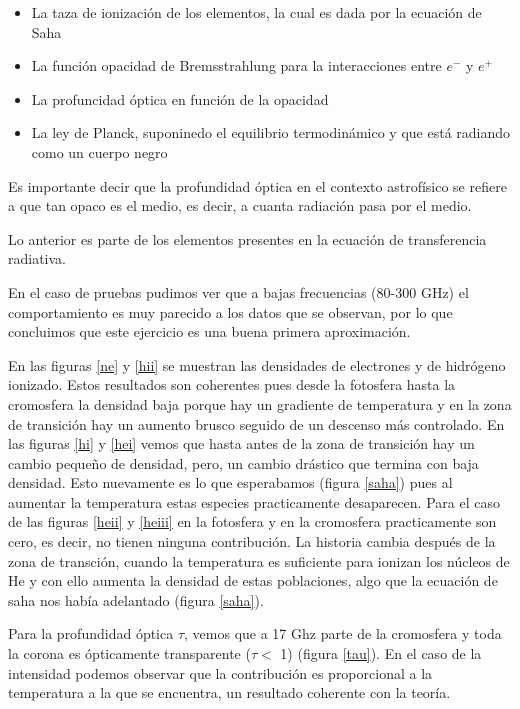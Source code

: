 \documentclass[a4paper]{article}
\begin{document}
\begin{itemize}
    \item La taza de ionización de los elementos, la cual es dada por la ecuación de Saha
    \item La función opacidad de Bremsstrahlung para la interacciones entre $e^-$ y $e^+$
    \item La profuncidad óptica en función de la opacidad
    \item La ley de Planck, suponinedo el equilibrio termodinámico y que está radiando como un cuerpo negro
\end{itemize}

Es importante decir que la profundidad óptica en el contexto astrofísico se refiere a que tan opaco es el medio, es decir, a cuanta radiación pasa por el medio.

Lo anterior es parte de los elementos presentes en la ecuación de transferencia radiativa.

En el caso de pruebas pudimos ver que a bajas frecuencias (80-300 GHz) el comportamiento es muy parecido a los datos que se observan, por lo que concluimos que este ejercicio es una buena primera aproximación.

En las figuras \ref{ne} y \ref{hii} se muestran las densidades de electrones y de hidrógeno ionizado. Estos resultados son coherentes pues desde la fotosfera hasta la cromosfera la densidad baja porque hay un gradiente de temperatura y en la zona de transición hay un aumento brusco seguido de un descenso más controlado. En las figuras \ref{hi} y \ref{hei} vemos que hasta antes de la zona de transición hay un cambio pequeño de densidad, pero, un cambio drástico que termina con baja densidad. Esto nuevamente es lo que esperabamos (figura \ref{saha}) pues al aumentar la temperatura estas especies practicamente desaparecen. Para el caso de las figuras \ref{heii} y \ref{heiii} en la fotosfera y en la cromosfera practicamente son cero, es decir, no tienen ninguna contribución. La historia cambia después de la zona de transción, cuando la temperatura es suficiente para ionizan los núcleos de He y con ello aumenta la densidad de estas poblaciones, algo que la ecuación de saha nos había adelantado (figura \ref{saha}). 

Para la profundidad óptica $\tau$, vemos que a 17 Ghz parte de la cromosfera y toda la corona es ópticamente transparente ($\tau <$ 1) (figura \ref{tau}). En el caso de la intensidad podemos observar que la contribución es proporcional a la temperatura a la que se encuentra, un resultado coherente con la teoría.
\end{document}
